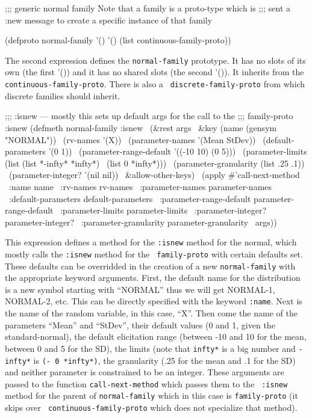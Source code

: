 \begincode
;;; generic normal family  Note that a family is a proto-type which is
;;; sent a :new message to create a specific instance of that family

(defproto normal-family '() '() (list continuous-family-proto))
\endcode

The second expression defines the {\tt normal-family\/} prototype.  It
has no slots of its own (the first '()) and it has no shared slots
(the second '()).  It inherits from the {\tt
continuous-family-proto\/}.  There is also a {\tt
discrete-family-proto\/} from which discrete families should inherit.

\begincode
;;; :isnew --- mostly this sets up default args for the call to the
;;; family-proto :isnew
(defmeth normal-family :isnew
\  	(\&rest args
\	 \&key (name (gensym "NORMAL"))
\	      (rv-names '(X))
\	      (parameter-names '(Mean StDev))
\	      (default-parameters '(0 1))
\	      (parameter-range-default '((-10 10) (0 5)))
\	      (parameter-limits (list (list *-infty* *infty*)
\				      (list 0 *infty*)))
\	      (parameter-granularity (list .25 .1))
\	      (parameter-integer? '(nil nil))
\	      \&allow-other-keys)
\  (apply \#'call-next-method
\   :name name
\   :rv-names rv-names
\   :parameter-names parameter-names
\   :default-parameters default-parameters
\   :parameter-range-default parameter-range-default
\   :parameter-limits parameter-limits
\   :parameter-integer? parameter-integer?
\   :parameter-granularity parameter-granularity
\   args))
\endcode

This expression defines a method for the {\tt :isnew\/} method for the
normal, which mostly calls the {\tt :isnew\/} method for the {\tt
family-proto\/} with certain defaults set.  These defaults can be
overridded in the creation of a new {\tt normal-family\/} with the
appropriate keyword arguments.  First, the default name for the
distribution is a new symbol starting with ``NORMAL''  thus we will
get NORMAL-1, NORMAL-2, etc.  This can be directly specified with the
keyword {\tt :name\/}.  Next is the name of the random variable, in
this case, ``X''.  Then come the name of the parameters ``Mean'' and
``StDev'', their default values (0 and 1, given the standard-normal),
the default elicitation range (between -10 and 10 for the mean,
between 0 and 5 for the SD), the limits (note that {\tt *infty*\/} is
a big number and {\tt *-infty*\/} is {\tt (- 0 *infty*)}, the
granularity (.25 for the mean and .1 for the SD) and neither parameter
is constrained to be an integer.  These arguments are passed to the
function {\tt call-next-method\/} which passes them to the {\tt
:isnew\/} method for the parent of {\tt normal-family\/} which in this
case is {\tt family-proto\/} (it skips over {\tt
continuous-family-proto\/} which does not specialize that method).

